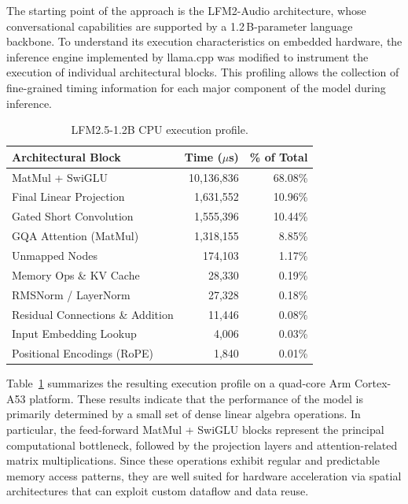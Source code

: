 The starting point of the approach is the LFM2-Audio architecture, whose
conversational capabilities are supported by a 1.2\,B-parameter language backbone. To
understand its execution characteristics on embedded hardware, the inference engine
implemented by llama.cpp was modified to instrument the execution of individual
architectural blocks. This profiling allows the collection of fine-grained timing
information for each major component of the model during inference.

\begin{table}[htbp]
\centering
\caption{LFM2.5-1.2B CPU execution profile.}
\label{tab:cpu_profile}
\begin{tabular}{lrr}
\hline
\textbf{Architectural Block} & \textbf{Time ($\mu$s)} & \textbf{\% of Total} \\ \hline
MatMul + SwiGLU & 10,136,836 & 68.08\% \\
Final Linear Projection & 1,631,552 & 10.96\% \\
Gated Short Convolution & 1,555,396 & 10.44\% \\
GQA Attention (MatMul) & 1,318,155 & 8.85\% \\
Unmapped Nodes & 174,103 & 1.17\% \\
Memory Ops \& KV Cache & 28,330 & 0.19\% \\
RMSNorm / LayerNorm & 27,328 & 0.18\% \\
Residual Connections \& Addition & 11,446 & 0.08\% \\
Input Embedding Lookup & 4,006 & 0.03\% \\
Positional Encodings (RoPE) & 1,840 & 0.01\% \\ \hline
\end{tabular}
\end{table}

Table~\ref{tab:cpu_profile} summarizes the resulting execution profile on a quad-core
Arm\textregistered{} Cortex\textregistered{}-A53 platform. These results indicate that
the performance of the model is primarily determined by a small set of dense linear
algebra operations. In particular, the feed-forward MatMul + SwiGLU blocks represent
the principal computational bottleneck, followed by the projection layers and
attention-related matrix multiplications. Since these operations exhibit regular and
predictable memory access patterns, they are well suited for hardware acceleration via
spatial architectures that can exploit custom dataflow and data reuse.

